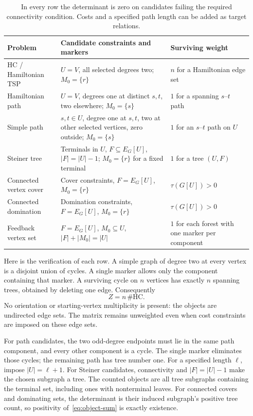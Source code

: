 \begin{table}[ht]
\centering\small
\renewcommand{\arraystretch}{1.16}
\begin{tabular}{@{}P{.23\linewidth}P{.44\linewidth}P{.25\linewidth}@{}}
\toprule
Problem & Candidate constraints and markers & Surviving weight\\
\midrule
HC / Hamiltonian TSP & $U=V$, all selected degrees two; $M_0=\{r\}$ & $n$ for a Hamiltonian edge set\\
Hamiltonian path & $U=V$, degrees one at distinct $s,t$, two elsewhere; $M_0=\{s\}$ & $1$ for a spanning $s$--$t$ path\\
Simple path & $s,t\in U$, degree one at $s,t$, two at other selected vertices, zero outside; $M_0=\{s\}$ & $1$ for an $s$--$t$ path on $U$\\
Steiner tree & Terminals in $U$, $F\subseteq E_G[U]$, $|F|=|U|-1$; $M_0=\{r\}$ for a fixed terminal & $1$ for a tree $(U,F)$\\
Connected vertex cover & Cover constraints, $F=E_G[U]$, $M_0=\{r\}$ & $\tau(G[U])>0$\\
Connected domination & Domination constraints, $F=E_G[U]$, $M_0=\{r\}$ & $\tau(G[U])>0$\\
Feedback vertex set & $F=E_G[U]$, $M_0\subseteq U$, $|F|+|M_0|=|U|$ & $1$ for each forest with one marker per component\\
\bottomrule
\end{tabular}
\caption{In every row the determinant is zero on candidates failing
the required connectivity condition. Costs and a specified path length
can be added as target relations.}
\label{tab:objects}
\end{table}

Here is the verification of each row. A simple graph of degree two at
every vertex is a disjoint union of cycles. A single marker allows
only the component containing that marker. A surviving cycle on $n$
vertices has exactly $n$ spanning trees, obtained by deleting one
edge. Consequently
\begin{equation}\label{eq:hc-readback}
 Z=n\,\#\mathrm{HC}.
\end{equation}
No orientation or starting-vertex multiplicity is present: the objects
are undirected edge sets. The matrix remains unweighted even when
cost constraints are imposed on these edge sets.

For path candidates, the two odd-degree endpoints must lie in the
same path component, and every other component is a cycle. The
single marker eliminates those cycles; the remaining path has tree
number one. For a specified length $\ell$, impose $|U|=\ell+1$.
For Steiner candidates, connectivity and $|F|=|U|-1$ make the chosen
subgraph a tree. The counted objects are all tree subgraphs containing
the terminal set, including ones with nonterminal leaves. For
connected covers and dominating sets, the determinant is their induced
subgraph's positive tree count, so positivity of~\eqref{eq:object-sum}
is exactly existence.

